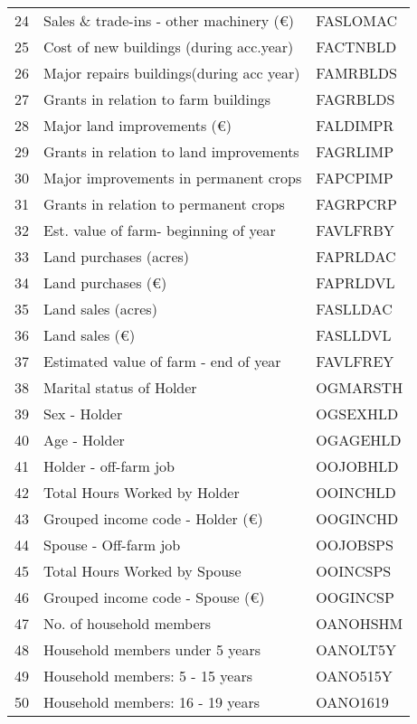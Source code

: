 \documentclass{article}\usepackage{graphicx, color}
\begin{document}
\begin{flushleft}
\begin{table}[ht]
\begin{center}
\begin{tabular}{rll}
  24 & Sales \& trade-ins - other machinery (€) & FASLOMAC \\ 
  25 & Cost of new buildings  (during acc.year) & FACTNBLD \\ 
  26 & Major repairs buildings(during acc year) & FAMRBLDS \\ 
  27 & Grants in relation to farm buildings & FAGRBLDS \\ 
  28 & Major land improvements           (€) & FALDIMPR \\ 
  29 & Grants in relation to land improvements & FAGRLIMP \\ 
  30 & Major improvements in permanent crops & FAPCPIMP \\ 
  31 & Grants in relation to permanent crops & FAGRPCRP \\ 
  32 & Est. value of farm- beginning of year & FAVLFRBY \\ 
  33 & Land purchases              (acres) & FAPRLDAC \\ 
  34 & Land purchases              (€) & FAPRLDVL \\ 
  35 & Land sales                  (acres) & FASLLDAC \\ 
  36 & Land sales                  (€) & FASLLDVL \\ 
  37 & Estimated value of farm - end of year & FAVLFREY \\ 
  38 & Marital status of Holder & OGMARSTH \\ 
  39 & Sex - Holder & OGSEXHLD \\ 
  40 & Age - Holder & OGAGEHLD \\ 
  41 & Holder - off-farm job & OOJOBHLD \\ 
  42 & Total Hours Worked by Holder & OOINCHLD \\ 
  43 & Grouped income code - Holder       (€) & OOGINCHD \\ 
  44 & Spouse - Off-farm job & OOJOBSPS \\ 
  45 & Total Hours Worked by Spouse & OOINCSPS \\ 
  46 & Grouped income code - Spouse       (€) & OOGINCSP \\ 
  47 & No. of household members & OANOHSHM \\ 
  48 & Household members under 5 years & OANOLT5Y \\ 
  49 & Household members: 5 - 15 years & OANO515Y \\ 
  50 & Household members: 16 - 19 years & OANO1619 \\ 
   \hline
\end{tabular}
\end{center}
\end{table}



\end{flushleft}
\end{document}
